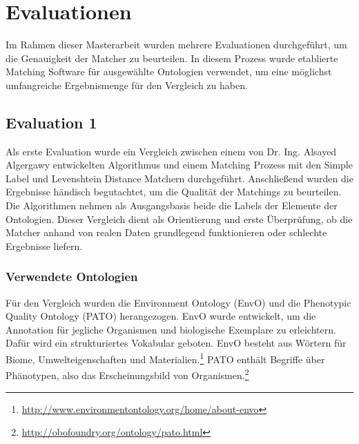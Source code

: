 %
\chapter{Evaluationen}
\label{chap:evaluation}
		
		Im Rahmen dieser Masterarbeit wurden mehrere Evaluationen durchgeführt, um die
		Genauigkeit der Matcher zu beurteilen. In diesem Prozess wurde etablierte
		Matching Software für ausgewählte Ontologien verwendet, um eine möglichst
		umfangreiche Ergebnismenge für den Vergleich zu haben.
		
		\section{Evaluation 1}
		\label{subsec:Evaluation 1}
		Als erste Evaluation wurde ein Vergleich zwischen einem von Dr. Ing. Alsayed
		Algergawy entwickelten Algorithmus und einem Matching Prozess mit den Simple
		Label und Levenshtein Distance Matchern durchgeführt. Anschließend wurden die
		Ergebnisse händisch begutachtet, um die Qualität der Matchings zu beurteilen. Die
		Algorithmen nehmen als Ausgangsbasis beide die Labels der Elemente der
		Ontologien. Dieser Vergleich dient als Orientierung und erste Überprüfung, ob
		die Matcher anhand von realen Daten grundlegend funktionieren oder schlechte Ergebnisse
		liefern.
		
		\subsection{Verwendete Ontologien}
		Für den Vergleich wurden die Environment Ontology (EnvO) und die Phenotypic
		Quality Ontology (PATO) herangezogen. EnvO wurde entwickelt, um die
		Annotation für jegliche Organismen und biologische Exemplare zu erleichtern.
		Dafür wird ein strukturiertes Vokabular geboten. EnvO besteht aus Wörtern für
		Biome, Umwelteigenschaften und
		Materialien.\footnote{\url{http://www.environmentontology.org/home/about-envo}}
		PATO enthält Begriffe über
		Phänotypen, also das
		Erscheinungsbild von
		Organismen.\footnote{\url{http://obofoundry.org/ontology/pato.html}}
		
